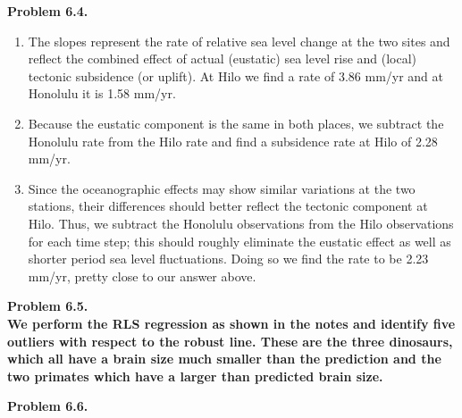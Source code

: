 \noindent
\bf{Problem 6.4.} \\

\begin{enumerate}[label=\alph*)]
\item  The slopes represent the rate of relative sea level change at the two sites and reflect the combined
effect of actual (eustatic) sea level rise and (local) tectonic subsidence (or uplift).  At Hilo we find a
rate of 3.86 mm/yr and at Honolulu it is 1.58 mm/yr.

\item Because the eustatic component is the same in both places, we subtract the Honolulu rate from
the Hilo rate and find a subsidence rate at Hilo of 2.28 mm/yr.

\item Since the oceanographic effects may show similar variations at the two stations, their
differences should better reflect the tectonic component at Hilo.  Thus, we subtract the Honolulu observations
from the Hilo observations for each time step; this should roughly eliminate the eustatic effect as well
as shorter period sea level fluctuations.  Doing so we find the rate to be 2.23 mm/yr, pretty close to our answer above.
\end{enumerate}

\noindent
\bf{Problem 6.5.} \\

\noindent
We perform the RLS regression as shown in the notes and identify five outliers with respect to the
robust line.  These are the three dinosaurs, which all have a brain size much smaller than the
prediction and the two primates which have a larger than predicted brain size.


\noindent
\bf{Problem 6.6.} \\

